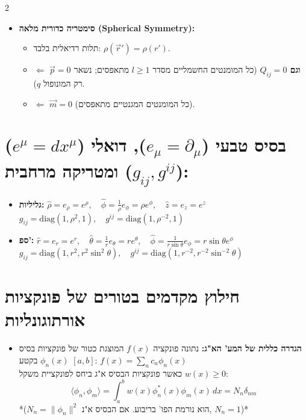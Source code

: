 \documentclass[10pt,a4paper]{article}
\begin{document}
\begin{multicols*}{2}
\begin{itemize}[leftmargin=*]
\begin{itemize}
        \item \textbf{סימטריה כדורית מלאה \textenglish{(Spherical Symmetry)}:}
        \begin{itemize}
            \item תלות רדיאלית בלבד: $\rho(\vec{r}') = \rho(r')$.
            \item $\Leftarrow$ \textbf{$\vec{p} = 0$ וגם $Q_{ij} = 0$} (כל המומנטים החשמליים מסדר $l \ge 1$ מתאפסים; נשאר רק המונופול $q$).
            \item $\Leftarrow$ \textbf{$\vec{m} = 0$} (כל המומנטים המגנטיים מתאפסים).
        \end{itemize}
    \end{itemize}
\end{itemize}

\section*{בסיס טבעי ($e_\mu = \partial_\mu$), דואלי ($e^\mu = dx^\mu$) ומטריקה מרחבית ($g_{ij}, g^{ij}$):}
\begin{itemize}
    \item \textbf{גליליות:} 
    $\hat{\rho} = e_\rho = e^\rho, \quad \hat{\phi} = \frac{1}{\rho} e_\phi = \rho e^\phi, \quad \hat{z} = e_z = e^z$ \\
    $g_{ij} = \text{diag}(1, \rho^2, 1), \quad g^{ij} = \text{diag}(1, \rho^{-2}, 1)$
    
    \item \textbf{ספ':} 
    $\hat{r} = e_r = e^r, \quad \hat{\theta} = \frac{1}{r} e_\theta = r e^\theta, \quad \hat{\phi} = \frac{1}{r \sin\theta} e_\phi = r\sin\theta e^\phi$ \\
    $g_{ij} = \text{diag}(1, r^2, r^2\sin^2\theta), \quad g^{ij} = \text{diag}(1, r^{-2}, r^{-2}\sin^{-2}\theta)$
\end{itemize}

\section{חילוץ מקדמים בטורים של פונקציות אורתוגונליות}

\begin{itemize}[leftmargin=*]
    \item \textbf{הגדרה כללית של המע' הא"ג:}
    נתונה פונקציה $f(x)$ המוצגת כטור של פונקציות בסיס $\phi_n(x)$ בקטע $[a,b]$:
    $f(x) = \sum_{n} c_n \phi_n(x)$\\
    כאשר פונקציות הבסיס א"ג ביחס לפונקציית משקל $w(x) \ge 0$:
    $$\langle \phi_n, \phi_m \rangle = \int_{a}^{b} w(x) \phi_n^*(x) \phi_m(x) \, dx = N_n \delta_{nm}$$
    \small{*($N_n = \|\phi_n\|^2$ הוא נורמת הפו' בריבוע. אם הבסיס א"נ, $N_n = 1$)*}


\end{itemize}
\end{multicols*}
\end{document}
